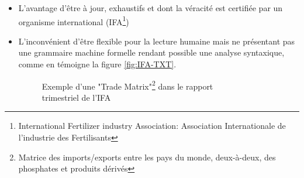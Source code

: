 		\begin{itemize}
		\item L'avantage d’être à jour, exhaustifs et dont la véracité est certifiée par un organisme international (IFA\footnote{International Fertilizer industry Association: Association Internationale de l'industrie des Fertilisants})
		\item L’inconvénient d’être flexible pour la lecture humaine mais ne présentant pas une grammaire machine formelle rendant possible une analyse syntaxique, comme en témoigne la figure \ref{fig:IFA-TXT}.
			\begin{figure}[H]
			    		\raggedright
		    			\captionsetup{justification=raggedright,
		    			singlelinecheck=false
		    			}
			    		\caption{Exemple d'une "Trade Matrix"\protect\footnote{Matrice des imports/exports entre les pays du monde, deux-à-deux, des phosphates et produits dérivés} dans le rapport\\trimestriel de l'IFA}
			    		\label{fig:IFA-PDF}
			\end{figure}	
		\end{itemize}
		

